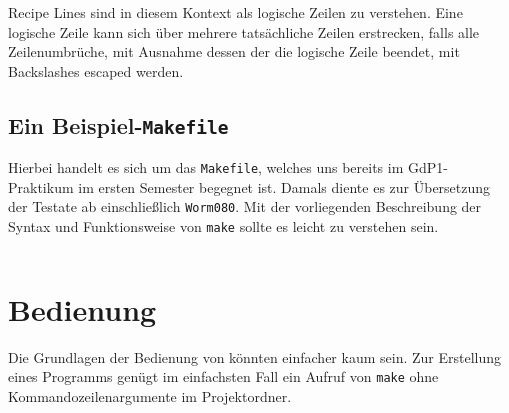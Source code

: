	Recipe Lines sind in diesem Kontext als logische Zeilen zu verstehen.
	Eine logische Zeile kann sich über mehrere tatsächliche Zeilen
	erstrecken, falls alle Zeilenumbrüche, mit Ausnahme dessen der die
	logische Zeile beendet, mit Backslashes escaped werden.

\clearpage \subsection{Ein Beispiel-\texttt{Makefile}}
\label{subsubsection:examplemakefile}

Hierbei handelt es sich um das \texttt{Makefile}, welches uns bereits im
GdP1-Praktikum im ersten Semester begegnet ist. Damals diente es zur Übersetzung
der Testate ab einschließlich \texttt{Worm080}. Mit der vorliegenden
Beschreibung der Syntax und Funktionsweise von \texttt{make} sollte es leicht zu
verstehen sein.

{
\footnotesize
\inputminted[linenos=true,stepnumber=5]{make}{../code/Worm080_Makefile}
}

\section{Bedienung}

Die Grundlagen der Bedienung von könnten einfacher kaum sein.
Zur Erstellung eines Programms genügt im einfachsten Fall ein Aufruf von
\texttt{make} ohne Kommandozeilenargumente im Projektordner.
